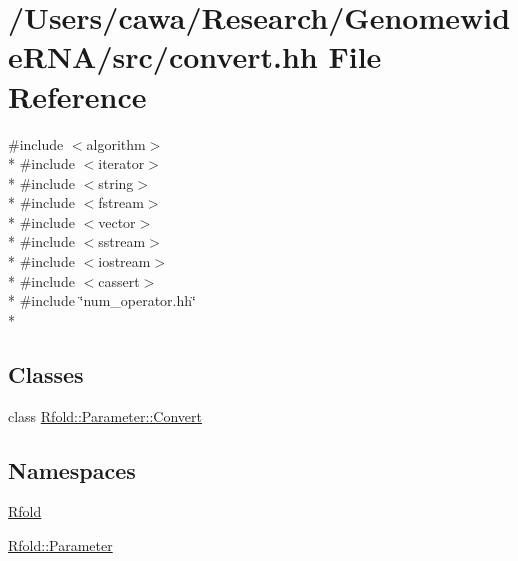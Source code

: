\hypertarget{convert_8hh}{\section{/\+Users/cawa/\+Research/\+Genomewide\+R\+N\+A/src/convert.hh File Reference}
\label{convert_8hh}
}
{\ttfamily \#include $<$algorithm$>$}\\*
{\ttfamily \#include $<$iterator$>$}\\*
{\ttfamily \#include $<$string$>$}\\*
{\ttfamily \#include $<$fstream$>$}\\*
{\ttfamily \#include $<$vector$>$}\\*
{\ttfamily \#include $<$sstream$>$}\\*
{\ttfamily \#include $<$iostream$>$}\\*
{\ttfamily \#include $<$cassert$>$}\\*
{\ttfamily \#include \char`\"{}num\+\_\+operator.\+hh\char`\"{}}\\*
\subsection*{Classes}
\begin{DoxyCompactItemize}
\item 
class \hyperlink{class_rfold_1_1_parameter_1_1_convert}{Rfold\+::\+Parameter\+::\+Convert}
\end{DoxyCompactItemize}
\subsection*{Namespaces}
\begin{DoxyCompactItemize}
\item 
 \hyperlink{namespace_rfold}{Rfold}
\item 
 \hyperlink{namespace_rfold_1_1_parameter}{Rfold\+::\+Parameter}
\end{DoxyCompactItemize}
